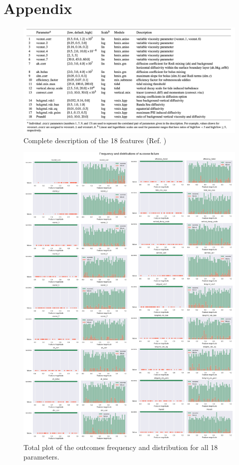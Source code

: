 \documentclass[english,notitlepage,reprint,nofootinbib]{revtex4-1}  %
\begin{document}
\onecolumngrid

\clearpage
\section*{Appendix}\label{sec:appendix}
\begin{figure}[h]
    \centering 
    \includegraphics[scale=0.5]{img/big_big_table.png}
    \caption{Complete description of the 18 features (Ref. \cite{failure})}
    \label{fig:big_big_table}
\end{figure}

\begin{figure}[h]
    \centering 
    \includegraphics[scale=1.5]{dataset/distributions_tot.png}
    \caption{Total plot of the outcomes frequency and distribution for all 18 parameters.}
    \label{data:tot}
\end{figure}
\end{document}
